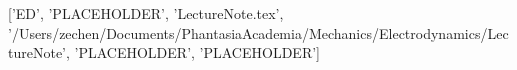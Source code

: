 ['ED', 'PLACEHOLDER', 'LectureNote.tex', '/Users/zechen/Documents/PhantasiaAcademia/Mechanics/Electrodynamics/LectureNote', 'PLACEHOLDER', 'PLACEHOLDER']
